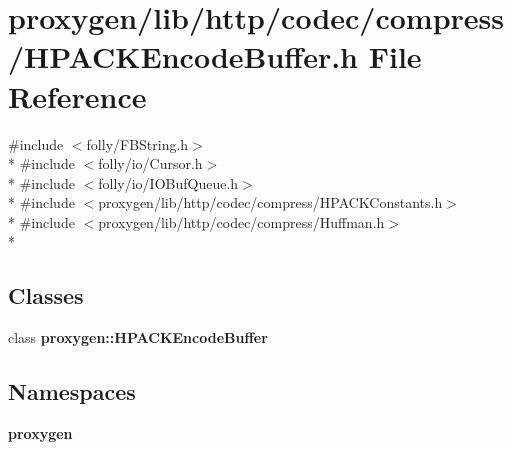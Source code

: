 \section{proxygen/lib/http/codec/compress/\+H\+P\+A\+C\+K\+Encode\+Buffer.h File Reference}
\label{HPACKEncodeBuffer_8h}
{\ttfamily \#include $<$folly/\+F\+B\+String.\+h$>$}\\*
{\ttfamily \#include $<$folly/io/\+Cursor.\+h$>$}\\*
{\ttfamily \#include $<$folly/io/\+I\+O\+Buf\+Queue.\+h$>$}\\*
{\ttfamily \#include $<$proxygen/lib/http/codec/compress/\+H\+P\+A\+C\+K\+Constants.\+h$>$}\\*
{\ttfamily \#include $<$proxygen/lib/http/codec/compress/\+Huffman.\+h$>$}\\*
\subsection*{Classes}
\begin{DoxyCompactItemize}
\item 
class {\bf proxygen\+::\+H\+P\+A\+C\+K\+Encode\+Buffer}
\end{DoxyCompactItemize}
\subsection*{Namespaces}
\begin{DoxyCompactItemize}
\item 
 {\bf proxygen}
\end{DoxyCompactItemize}

